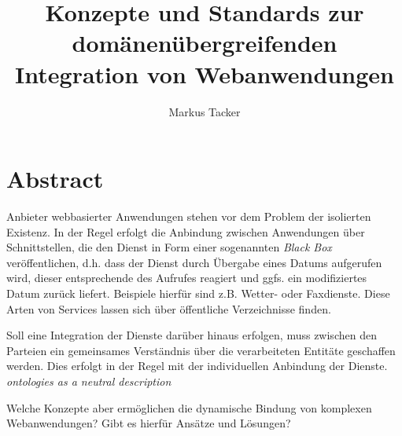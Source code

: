 \documentclass[12pt]{article}
\begin{document}
\author{Markus Tacker}
\title{Konzepte und Standards zur domänenübergreifenden Integration von Webanwendungen}
\maketitle
\section*{Abstract}
Anbieter webbasierter Anwendungen stehen vor dem Problem der isolierten Existenz. In der Regel erfolgt die Anbindung zwischen Anwendungen über Schnittstellen, die den Dienst in Form einer sogenannten \emph{Black Box} veröffentlichen, d.h. dass der Dienst durch Übergabe eines Datums aufgerufen wird, dieser entsprechende des Aufrufes reagiert und ggfs. ein modifiziertes Datum zurück liefert. Beispiele hierfür sind z.B. Wetter- oder Faxdienste. Diese Arten von Services lassen sich über öffentliche Verzeichnisse finden.

Soll eine Integration der Dienste darüber hinaus erfolgen, muss zwischen den Parteien ein gemeinsames Verständnis über die verarbeiteten Entitäte geschaffen werden. Dies erfolgt in der Regel mit der individuellen Anbindung der Dienste. \emph{ontologies as a
neutral description}

Welche Konzepte aber ermöglichen die dynamische Bindung von komplexen Webanwendungen? Gibt es hierfür Ansätze und Lösungen?

 
\end{document}
